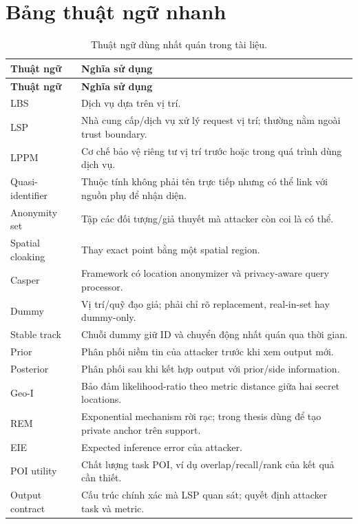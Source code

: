 \documentclass[11pt,a4paper,oneside]{report}
\begin{document}
\chapter{Bảng thuật ngữ nhanh}

\begin{longtable}{P{3.5cm}P{10.7cm}}
\caption{Thuật ngữ dùng nhất quán trong tài liệu.}\label{tab:glossary}\\
\toprule
\textbf{Thuật ngữ} & \textbf{Nghĩa sử dụng}\\
\midrule
\endfirsthead
\toprule
\textbf{Thuật ngữ} & \textbf{Nghĩa sử dụng}\\
\midrule
\endhead
LBS & Dịch vụ dựa trên vị trí.\\
LSP & Nhà cung cấp/dịch vụ xử lý request vị trí; thường nằm ngoài trust boundary.\\
LPPM & Cơ chế bảo vệ riêng tư vị trí trước hoặc trong quá trình dùng dịch vụ.\\
Quasi-identifier & Thuộc tính không phải tên trực tiếp nhưng có thể link với nguồn phụ để nhận diện.\\
Anonymity set & Tập các đối tượng/giả thuyết mà attacker còn coi là có thể.\\
Spatial cloaking & Thay exact point bằng một spatial region.\\
Casper & Framework có location anonymizer và privacy-aware query processor.\\
Dummy & Vị trí/quỹ đạo giả; phải chỉ rõ replacement, real-in-set hay dummy-only.\\
Stable track & Chuỗi dummy giữ ID và chuyển động nhất quán qua thời gian.\\
Prior & Phân phối niềm tin của attacker trước khi xem output mới.\\
Posterior & Phân phối sau khi kết hợp output với prior/side information.\\
Geo-I & Bảo đảm likelihood-ratio theo metric distance giữa hai secret locations.\\
REM & Exponential mechanism rời rạc; trong thesis dùng để tạo private anchor trên support.\\
EIE & Expected inference error của attacker.\\
POI utility & Chất lượng task POI, ví dụ overlap/recall/rank của kết quả cần thiết.\\
Output contract & Cấu trúc chính xác mà LSP quan sát; quyết định attacker task và metric.\\
\bottomrule
\end{longtable}
\end{document}
